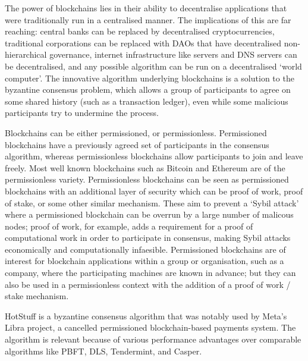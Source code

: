 

The power of blockchains lies in their ability to decentralise applications that were traditionally run in a centralised manner. The implications of this are far reaching: central banks can be replaced by decentralised cryptocurrencies, traditional corporations can be replaced with DAOs that have decentralised non-hierarchical governance, internet infrastructure like servers and DNS servers can be decentralised, and any possible algorithm can be run on a decentralised `world computer'. The innovative algorithm underlying blockchains is a solution to the byzantine consensus problem, which allows a group of participants to agree on some shared history (such as a transaction ledger), even while some malicious participants try to undermine the process.

Blockchains can be either permissioned, or permissionless. Permissioned blockchains have a previously agreed set of participants in the consensus algorithm, whereas permissionless blockchains allow participants to join and leave freely. Most well known blockchains such as Bitcoin and Ethereum are of the permissionless variety. Permissionless blockchains can be seen as permissioned blockchains with an additional layer of security which can be proof of work, proof of stake, or some other similar mechanism. These aim to prevent a `Sybil attack' where a permissioned blockchain can be overrun by a large number of malicous nodes; proof of work, for example, adds a requirement for a proof of computational work in order to participate in consensus, making Sybil attacks economically and computationally infaesible. Permissioned blockchains are of interest for blockchain applications within a group or organisation, such as a company, where the participating machines are known in advance; but they can also be used in a permissionless context with the addition of a proof of work / stake mechanism.

HotStuff is a byzantine consensus algorithm that was notably used by Meta's Libra project, a cancelled permissioned blockchain-based payments system. The algorithm is relevant because of various performance advantages over comparable algorithms like PBFT, DLS, Tendermint, and Casper.


